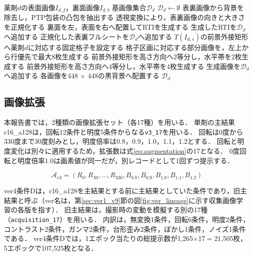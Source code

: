 \documentclass[uplatex,dvipdfmx]{jsarticle}
\begin{document}
\begin{algorithm}[H]
  \caption{収集画像からの基画像生成}
  \label{alg:image_generation}
    \begin{algorithmic}[1]
    \REQUIRE 薬剤$d$の表面画像$I_{d,f}$，裏面画像$I_{d,b}$
    \ENSURE 基画像集合$\mathcal{D}_d$
    \STATE $\mathcal{D}_d \gets \emptyset$
    \STATE 表裏画像から背景を除去し，PTP包装の凸包を抽出する
    \STATE 透視変換により，表裏画像の向きと大きさを正規化する
    \STATE 裏面を左，表面を右へ配置してRTIを生成する
    \STATE 生成したRTIを$\mathcal{D}_d$へ追加する
    \STATE 正規化した表裏フルシートを$\mathcal{D}_d$へ追加する
      \STATE $T(I_{d,s})$の前景外接矩形へ薬剤$d$に対応する固定格子を設定する
      \STATE 格子区画に対応する部分画像を，左上から行優先で最大8枚生成する
      \STATE 前景外接矩形を高さ方向へ2等分し，水平帯を2枚生成する
      \STATE 前景外接矩形を高さ方向へ4等分し，水平帯を4枚生成する
      \STATE 生成画像を$\mathcal{D}_d$へ追加する
    \ENDFOR
    \STATE 各画像を448 $\times$ 448の黒背景へ配置する
    \RETURN $\mathcal{D}_d$
  \end{algorithmic}
\end{algorithm}

\subsection{画像拡張}

本報告書では，2種類の画像拡張セット（各17種）を用いる．
単剤の主結果r16\_a128は，回転12条件と明度5条件からなる\texttt{v3\_17}を用いる．
回転は0度から330度まで30度刻みとし，明度倍率は0.8，0.9，1.0，1.1，1.2とする．
回転と明度変化は別々に適用するため，拡張数は式\eqref{eq:augmentation}の17となる．
0度回転と明度倍率1.0は画素値が同一だが，別レコードとして1回ずつ提示する．

\begin{equation}
  \mathcal{A}_{v3}
  =
  \left(
    R_{0},R_{30},\ldots,R_{330},
    B_{0.8},B_{0.9},B_{1.0},B_{1.1},B_{1.2}
  \right)
  \label{eq:augmentation}
\end{equation}

ver4条件Dは，r16\_a128を主結果とする前に主結果としていた条件であり，旧主結果と呼ぶ（ver名は，第\ref{sec:ver1_v9}節の図\ref{fig:ver_lineage}に示す収集画像学習の各版を指す）．
旧主結果は，撮影時の変動を模擬する別の17種（\texttt{acquisition\_17}）を用いる．
内訳は，無変換1条件，回転6条件，明度2条件，コントラスト2条件，ガンマ2条件，台形歪み2条件，ぼかし1条件，ノイズ1条件である．
ver4条件Dでは，1エポック当たりの総提示数が1,265$\times$17$=$21,505枚，5エポックで107,525枚となる．
\end{document}
